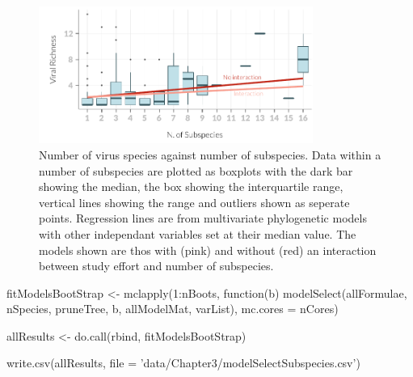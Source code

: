 \begin{knitrout}\footnotesize
{}\color{fgcolor}\begin{figure}[t]

{\centering \includegraphics[width=0.8\textwidth]{figure/boxplot-1} 

}

\caption[Number of virus species against number of subspecies]{Number of virus species against number of subspecies. 
Data within a number of subspecies are plotted as boxplots with the dark bar showing the median, the box showing the interquartile range, vertical lines showing the range and outliers shown as seperate points.
Regression lines are from multivariate phylogenetic models with other independant variables set at their median value.
The models shown are thos with (pink) and without (red) an interaction between study effort and number of subspecies.
}\label{fig:boxplot}
\end{figure}


\end{knitrout}




fitModelsBootStrap <- mclapply(1:nBoots, function(b) modelSelect(allFormulae, nSpecies, pruneTree, b, allModelMat, varList), mc.cores = nCores)

allResults <- do.call(rbind, fitModelsBootStrap)

write.csv(allResults, file = 'data/Chapter3/modelSelectSubspecies.csv')
















\clearpage


















